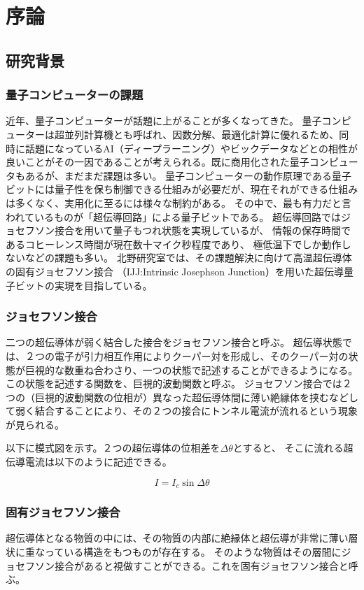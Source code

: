 \chapter{序論}


\section{研究背景}
\subsection{量子コンピューターの課題}
近年、量子コンピューターが話題に上がることが多くなってきた。
量子コンピューターは超並列計算機とも呼ばれ、因数分解、最適化計算に優れるため、同時に話題になっているAI（ディープラーニング）やビックデータなどとの相性が良いことがその一因であることが考えられる。既に商用化された量子コンピュータもあるが、まだまだ課題は多い。
量子コンピューターの動作原理である量子ビットには量子性を保ち制御できる仕組みが必要だが、現在それができる仕組みは多くなく、実用化に至るには様々な制約がある。
その中で、最も有力だと言われているものが「超伝導回路」による量子ビットである。
超伝導回路ではジョセフソン接合を用いて量子もつれ状態を実現しているが、
情報の保存時間であるコヒーレンス時間が現在数十マイク秒程度であり、
極低温下でしか動作しないなどの課題も多い。
北野研究室では、その課題解決に向けて高温超伝導体の固有ジョセフソン接合
（IJJ:Intrinsic Josephson Junction）を用いた超伝導量子ビットの実現を目指している。

\subsection{ジョセフソン接合}
二つの超伝導体が弱く結合した接合をジョセフソン接合と呼ぶ。
超伝導状態では、２つの電子が引力相互作用によりクーパー対を形成し、そのクーパー対の状態が巨視的な数重ね合わさり、一つの状態で記述することができるようになる。
この状態を記述する関数を、巨視的波動関数と呼ぶ。
ジョセフソン接合では２つの（巨視的波動関数の位相が）異なった超伝導体間に薄い絶縁体を挟むなどして弱く結合することにより、その２つの接合にトンネル電流が流れるという現象が見られる。

以下に模式図を示す。２つの超伝導体の位相差を$ \Delta \theta $とすると、
そこに流れる超伝導電流は以下のように記述できる。

\[ I = I_c \sin{\Delta \theta } \]

\subsection{固有ジョセフソン接合}
超伝導体となる物質の中には、その物質の内部に絶縁体と超伝導が非常に薄い層状に重なっている構造をもつものが存在する。
そのような物質はその層間にジョセフソン接合があると視做すことができる。これを固有ジョセフソン接合と呼ぶ。

